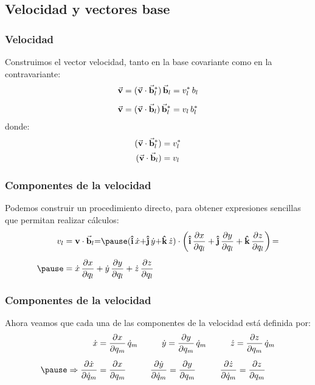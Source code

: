 \documentclass[12pt]{beamer}
\begin{document}
\subsection{Velocidad y vectores base}

\begin{frame}
\frametitle{Velocidad}
Construimos el vector velocidad, tanto en la base covariante como en la contravariante:
\pause
\begin{align}
\begin{aligned}
\va{v} &= (\va{v} \cdot \va{b}_{l}^{*}) \, \va{b}_{l} = v_{l}^{*} \, b_{l} \\[0.5em]
\va{v} &= (\va{v} \cdot \va{b}_{l}) \, \va{b}_{l}^{*} = v_{l} \, b_{l}^{*}
\end{aligned}
\label{eq:ecuacion_01_06}
\end{align}
\pause
donde:
\begin{align*}
(\va{v} \cdot \va{b}_{l}^{*}) &= v_{l}^{*} \\
(\va{v} \cdot \va{b}_{l}) &= v_{l}
\end{align*}
\end{frame}
\begin{frame}
\frametitle{Componentes de la velocidad}
Podemos construir un procedimiento directo, para obtener expresiones sencillas que permitan realizar cálculos:
\pause
\begin{equation}
\begin{aligned}
v_{l} &= \vb{v} \cdot \va{b}_{l} {=} \pause (\vu{i} \, \dot{x} {+} \vu{j} \, \dot{y} {+} \vu{k} \, \dot{z}) \cdot \left( \vu{i} \, \pdv{x}{q_{l}} + \vu{j} \, \pdv{y}{q_{l}} + \vu{k} \, \pdv{z}{q_{l}}\right) {=} \\[0.5em] \pause
&= \dot{x} \, \pdv{x}{q_{l}} + \dot{y} \, \pdv{y}{q_{l}} + \dot{z} \, \pdv{z}{q_{l}}
\end{aligned}
\label{eq:ecuacion_01_07}
\end{equation}
\end{frame}
\begin{frame}
\frametitle{Componentes de la velocidad}
Ahora veamos que cada una de las componentes de la velocidad está definida por:
\begin{equation}
\begin{aligned}[b]
\dot{x} &= \pdv{x}{q_{m}} \, \dot{q}_{m} \hspace{1cm} \dot{y} = \pdv{y}{q_{m}} \, \dot{q}_{m} \hspace{1cm} \dot{z} = \pdv{z}{q_{m}} \, \dot{q}_{m} \\[0.5em] \pause
\Rightarrow \pdv{\dot{x}}{\dot{q}_{m}} &= \pdv{x}{q_{m}}  \hspace{1cm} \pdv{\dot{y}}{\dot{q}_{m}} = \pdv{y}{q_{m}}  \hspace{1cm} \pdv{\dot{z}}{\dot{q}_{m}} = \pdv{z}{q_{m}} 
\end{aligned}
\label{eq:ecuacion_01_08}
\end{equation}
\end{frame}
\end{document}
